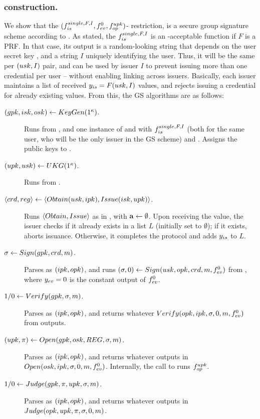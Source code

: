 \subsubsection{\CUASGS construction.} %
We show that the $(f_{is}^{single,F,I},f_{ev}^0,f_{op}^{upk})$-\CUASGen
restriction, is a secure group signature scheme according to \cite{bsz05}.
As stated, the $f_{is}^{single,F,I}$ is an \UAS-acceptable function if $F$ is a
PRF. In that case, its output is a random-looking string that depends on the
user secret key \usk, and a string $I$ uniquely identifying the user. Thus, it
will be the same per $(usk,I)$ pair, and can be used by issuer $I$ to prevent
issuing more than one credential per user -- without enabling linking across
issuers. Basically, each issuer maintains a list of received $y_{is} = F(usk,
I)$ values, and rejects issuing a credential for already existing \yissue
values. From this, the GS algorithms are as follows:

\begin{description}
\item[$(gpk,isk,osk) \gets KeyGen(1^\kappa)$.] Runs \Setup from \CUASGen,
  and one instance of \KeyGen and \ISet with $f_{is}^{single,F,I}$ (both for
  the same user, who will be the only issuer in the GS scheme) and \OKeyGen.
  Assigns the public keys to \gpk.
\item[$(upk,usk) \gets UKG(1^\kappa)$.] Runs \KeyGen from \CUASGen.
\item[$\langle crd,reg \rangle \gets
  \langle Obtain(usk,ipk),Issue(isk,upk)\rangle$.] Runs $\langle Obtain,
  Issue\rangle$ as in \CUASGen, with $\mathbf{a} \gets \emptyset$. Upon receiving
  the \yissue value, the issuer checks if it already exists in a list $L$
  (initially set to $\emptyset$); if it exists, aborts issuance. Otherwise, it
  completes the protocol and adds $y_{is}$ to $L$.
\item[$\sigma \gets Sign(gpk,crd,m)$.] Parses \gpk as $(ipk,opk)$, and
  runs $(\sigma,0) \gets Sign(usk,opk,crd,m,f_{ev}^0)$ from \CUASGen,
  where $y_{ev} = 0$ is the constant output of $f_{ev}^0$.
\item[$1/0 \gets Verify(gpk,\sigma,m)$.] Parses \gpk as $(ipk,opk)$, and
  returns whatever $Verify(opk,ipk,\sigma,0,m,f_{ev}^0)$ from \CUASGen
  outputs.
\item[$(\upk,\pi) \gets \Open(\gpk,\osk,\trans,\sig,\msg)$.] Parses \gpk as
  $(ipk,opk)$, and returns whatever \CUASGen outputs in $Open(osk,ipk,\sigma,
  0,m,f_{ev}^0)$. Internally, the call to \Open runs $f_{op}^{upk}$.
\item[$1/0 \gets Judge(gpk,\pi,upk,\sigma,m)$.] Parses \gpk as $(ipk,
  opk)$, and returns whatever \CUASGen outputs in $Judge(opk,upk,\pi,\sigma,
  0,m)$.
\end{description}

